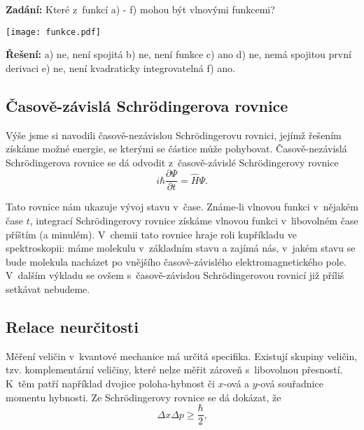 \begin{priklad}
\textbf{Zadání:} Které z~funkcí a) - f) mohou být vlnovými funkcemi?

\begin{center}
\texttt{[image: funkce.pdf]}

\end{center}

\textbf{Řešení:} a) ne, není spojitá b) ne, není funkce c) ano d) ne, nemá spojitou první derivaci e) ne, není kvadraticky integrovatelná f) ano.
\end{priklad}

\subsection{Časově-závislá Schr\"odingerova rovnice}
Výše jsme si navodili časově-nezávislou Schr\"odingerovu rovnici, jejímž řešením získáme možné energie, se kterými se částice může pohybovat. Časově-nezávislá Schr\"odingerova rovnice se dá odvodit z~časově-závislé Schr\"odingerovy rovnice
\begin{equation}
\boxed{i\hbar \frac{\partial\Psi}{\partial t} = \hat{H}\Psi \mbox{.}}
\label{rov:Casovachr1}
\end{equation}

\noindent Tato rovnice nám ukazuje vývoj stavu v~čase. Známe-li vlnovou funkci v~nějakém čase $t$, integrací Schr\"odingerovy rovnice získáme vlnovou funkci v~libovolném čase příštím (a minulém). V~chemii tato rovnice hraje roli kupříkladu ve spektroskopii: máme molekulu v~základním stavu a zajímá nás, v~jakém stavu se bude molekula nacházet po  vnějšího časově-závislého elektromagnetického pole. V~dalším výkladu se ovšem s~časově-závislou Schr\"odingerovou rovnicí již příliš setkávat nebudeme. 

\subsection{Relace neurčitosti}

Měření veličin v~kvantové mechanice má určitá specifika. Existují skupiny veličin, tzv. komplementární veličiny, které nelze měřit zároveň s~libovolnou přesností. K~těm patří například dvojice poloha-hybnost či $x$-ová a $y$-ová souřadnice momentu hybnosti. Ze Schr\"odingerovy rovnice se dá dokázat, že
\begin{equation}
\boxed{\Delta x \Delta p \geq \frac{\hbar}{2}\mbox{,}}
\label{rov:Neurcitost1}
\end{equation}

